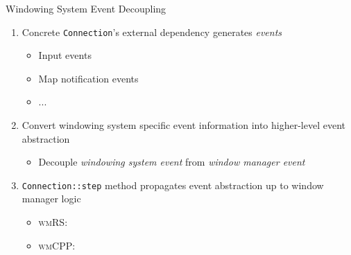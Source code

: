 \begin{frame}[fragile]{Windowing System Event Decoupling \hfill {\footnotesize \currentname}}


    \begin{enumerate}

        \item Concrete \texttt{Connection}'s external dependency generates \textit{events}
            \begin{itemize}
                \item Input events
                \item Map notification events
                \item ...
            \end{itemize}

        \item Convert windowing system specific event information into higher-level event abstraction
            \begin{itemize}
                \item Decouple \textit{windowing system event} from \textit{window manager event}
            \end{itemize}

        \item \texttt{Connection::step} method propagates event abstraction up to window manager logic
            \begin{itemize}
                \item \textsc{wmRS}: 
                \item \textsc{wmCPP}: 
            \end{itemize}

    \end{enumerate}

    \vfill

\end{frame}

